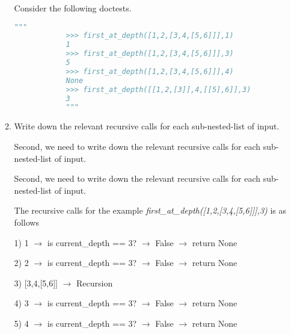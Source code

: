 \documentclass[12pt]{article}
\begin{document}
\begin{enumerate}[a.]
\begin{mdframed}
\begin{enumerate}[1.]
\begin{mdframed}
            \bigskip

            Consider the following doctests.

            \begin{lstlisting}[language=python]
            """
            >>> first_at_depth([1,2,[3,4,[5,6]]],1)
            1
            >>> first_at_depth([1,2,[3,4,[5,6]]],3)
            5
            >>> first_at_depth([1,2,[3,4,[5,6]]],4)
            None
            >>> first_at_depth([[1,2,[3]],4,[[5],6]],3)
            3
            """
            \end{lstlisting}

            \end{mdframed}

            \item Write down the relevant recursive calls for each sub-nested-list of input.

            \bigskip

            Second, we need to write down the relevant recursive calls for each sub-nested-list of input.

            \bigskip

            \begin{mdframed}

            \bigskip

            Second, we need to write down the relevant recursive calls for each sub-nested-list of input.

            \bigskip

            The recursive calls for the example \textit{first\_at\_depth([1,2,[3,4,[5,6]]],3)}
            is as follows

            \begin{mdframed}

                1) 1 $\to$ is current\_depth == 3? $\to$ False $\to$ return None

                2) 2 $\to$ is current\_depth == 3? $\to$ False $\to$ return None

                3) [3,4,[5,6]] $\to$ Recursion

                \bigskip

                \hspace{10mm} 4) 3 $\to$ is current\_depth == 3? $\to$ False $\to$ return None

                \hspace{10mm} 5) 4 $\to$ is current\_depth == 3? $\to$ False $\to$ return None


\end{mdframed}
\end{mdframed}
\end{enumerate}
\end{mdframed}
\end{enumerate}
\end{document}
